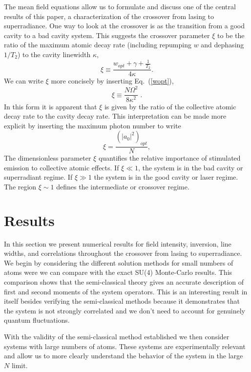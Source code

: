 \documentclass[aps,
twocolumn,
superscriptaddress,groupedaddress]{revtex4}
\begin{document}
The mean field equations allow us to formulate and discuss one of the
central results of this paper, a characterization of the crossover from
lasing to superradiance.  One way to look at the crossover is as the
transition from a good cavity to a bad cavity system.  This suggests the
crossover parameter $\xi$ to be the ratio of the maximum atomic decay
rate (including repumping $w$ and dephasing $1/T_2$) to the cavity
linewidth $\kappa$,
\begin{equation}
\xi\equiv\frac{ w_{opt}+\gamma+\frac{1}{T_2}}{4\kappa}.
\label{CrossoverParameter}
\end{equation}
We can write $\xi$ more concisely by inserting Eq.~(\ref{wopt}),
\begin{equation}
\xi\equiv \frac{N \Omega^2}{8\kappa^2}\;.
\label{CrossoverParameter2}
\end{equation}
In this form it is apparent that $\xi$ is given by the ratio of the
collective atomic decay rate to the cavity decay rate.  This
interpretation can be made more explicit by inserting the maximum photon
number to write
\begin{equation}
\xi = \frac{(|a_0|^2)_{opt}}{N},
\end{equation}
The dimensionless parameter $\xi$ quantifies the relative importance of
stimulated emission to collective atomic effects. If $\xi\ll1$, the
system is in the bad cavity or superradiant regime. If $\xi\gg1$ the
system is in the good cavity or laser regime. The region $\xi\sim1$
defines the intermediate or crossover regime.


\section{Results}
\label{sec:Results}

In this section we present numerical results for field intensity,
inversion, line widths, and correlations throughout the crossover from
lasing to superradiance.  We begin by considering the different solution
methods for small numbers of atoms were we can compare with the exact
SU(4) Monte-Carlo results.  This comparison shows that the semi-classical
theory gives an accurate description of first and second moments of the
system operators.  This is an interesting result in itself besides
verifying the semi-classical methods because it demonstrates that the
system is not strongly correlated and we don't need to account for
genuinely quantum fluctuations.

With the validity of the semi-classical method established we then
consider systems with large numbers of atoms.  These systems are
experimentally relevant and allow us to more clearly understand the
behavior of the system in the large $N$ limit.
\end{document}
